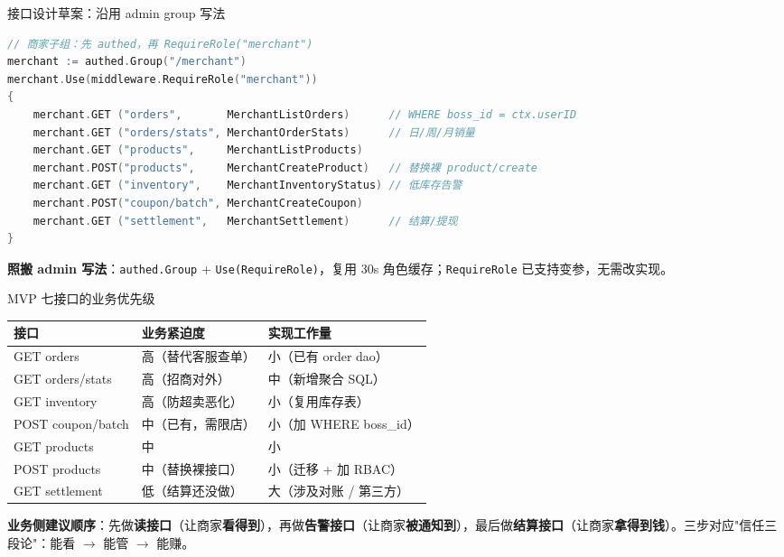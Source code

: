 \begin{frame}[fragile]{接口设计草案：沿用 admin group 写法}
\begin{lstlisting}[language=Go,firstnumber=135,
  caption={\srcnote{对照 routes/router.go:135--141 admin 子组，新增 merchant 子组}}]
// 商家子组：先 authed，再 RequireRole("merchant")
merchant := authed.Group("/merchant")
merchant.Use(middleware.RequireRole("merchant"))
{
    merchant.GET ("orders",       MerchantListOrders)      // WHERE boss_id = ctx.userID
    merchant.GET ("orders/stats", MerchantOrderStats)      // 日/周/月销量
    merchant.GET ("products",     MerchantListProducts)
    merchant.POST("products",     MerchantCreateProduct)   // 替换裸 product/create
    merchant.GET ("inventory",    MerchantInventoryStatus) // 低库存告警
    merchant.POST("coupon/batch", MerchantCreateCoupon)
    merchant.GET ("settlement",   MerchantSettlement)      // 结算/提现
}
\end{lstlisting}
\small \textbf{照搬 admin 写法}：\texttt{authed.Group} + \texttt{Use(RequireRole)}，复用 30s 角色缓存；\texttt{RequireRole} 已支持变参，无需改实现。
\end{frame}

\begin{frame}{MVP 七接口的业务优先级}
\begin{tabular}{@{}lll@{}}
\toprule
接口 & 业务紧迫度 & 实现工作量 \\
\midrule
GET orders            & 高（替代客服查单） & 小（已有 order dao） \\
GET orders/stats      & 高（招商对外）     & 中（新增聚合 SQL） \\
GET inventory         & 高（防超卖恶化）   & 小（复用库存表） \\
POST coupon/batch     & 中（已有，需限店） & 小（加 WHERE boss\_id） \\
GET products          & 中                & 小 \\
POST products         & 中（替换裸接口）   & 小（迁移 + 加 RBAC） \\
GET settlement        & 低（结算还没做）   & 大（涉及对账 / 第三方） \\
\bottomrule
\end{tabular}
\vspace{2mm}
\small \textbf{业务侧建议顺序}：先做\textbf{读接口}（让商家\textbf{看得到}），再做\textbf{告警接口}（让商家\textbf{被通知到}），最后做\textbf{结算接口}（让商家\textbf{拿得到钱}）。三步对应"信任三段论"：能看 $\to$ 能管 $\to$ 能赚。
\end{frame}


